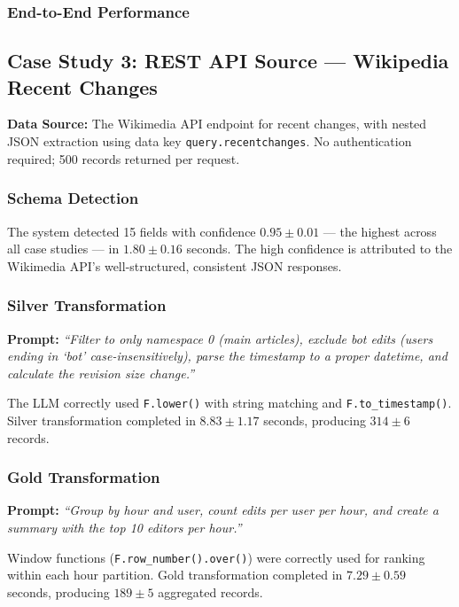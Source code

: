 \documentclass[12pt, a4paper]{article}
\begin{document}
\subsubsection{End-to-End Performance}
\begin{center}
\end{center}


\subsection{Case Study 3: REST API Source --- Wikipedia Recent Changes}

\textbf{Data Source:} The Wikimedia API endpoint for recent changes, with nested JSON extraction using data key \texttt{query.recentchanges}. No authentication required; 500 records returned per request.

\subsubsection{Schema Detection}
The system detected 15 fields with confidence $0.95 \pm 0.01$ --- the highest across all case studies --- in $1.80 \pm 0.16$ seconds. The high confidence is attributed to the Wikimedia API's well-structured, consistent JSON responses.

\subsubsection{Silver Transformation}
\textbf{Prompt:} \textit{``Filter to only namespace 0 (main articles), exclude bot edits (users ending in `bot' case-insensitively), parse the timestamp to a proper datetime, and calculate the revision size change.''}

The LLM correctly used \texttt{F.lower()} with string matching and \texttt{F.to\_timestamp()}. Silver transformation completed in $8.83 \pm 1.17$ seconds, producing $314 \pm 6$ records.

\subsubsection{Gold Transformation}
\textbf{Prompt:} \textit{``Group by hour and user, count edits per user per hour, and create a summary with the top 10 editors per hour.''}

Window functions (\texttt{F.row\_number().over()}) were correctly used for ranking within each hour partition. Gold transformation completed in $7.29 \pm 0.59$ seconds, producing $189 \pm 5$ aggregated records.
\end{document}
